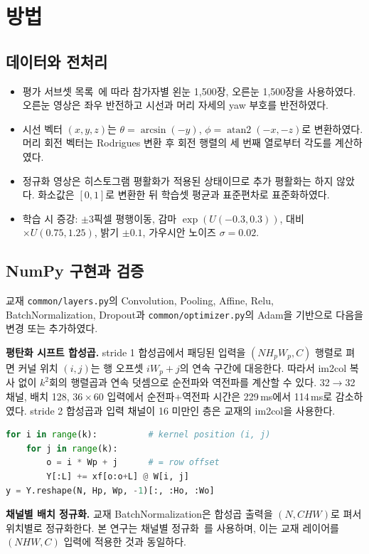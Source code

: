 \documentclass[10pt,twocolumn,a4paper]{article}
\begin{document}
\section{방법}
\subsection{데이터와 전처리}
\begin{itemize}
\item 평가 서브셋 목록~\cite{zhang2015}에 따라 참가자별 왼눈 1,500장, 오른눈 1,500장을 사용하였다. 오른눈 영상은 좌우 반전하고 시선과 머리 자세의 yaw 부호를 반전하였다.
\item 시선 벡터 $(x,y,z)$는 $\theta=\arcsin(-y)$, $\phi=\operatorname{atan2}(-x,-z)$로 변환하였다. 머리 회전 벡터는 Rodrigues 변환 후 회전 행렬의 세 번째 열로부터 각도를 계산하였다.
\item 정규화 영상은 히스토그램 평활화가 적용된 상태이므로 추가 평활화는 하지 않았다. 화소값은 $[0,1]$로 변환한 뒤 학습셋 평균과 표준편차로 표준화하였다.
\item 학습 시 증강: $\pm3$픽셀 평행이동, 감마 $\exp(U(-0.3,0.3))$, 대비 $\times U(0.75,1.25)$, 밝기 $\pm0.1$, 가우시안 노이즈 $\sigma=0.02$.
\end{itemize}

\subsection{NumPy 구현과 검증}
교재 \texttt{common/layers.py}의 Convolution, Pooling, Affine, Relu, BatchNormalization, Dropout과 \texttt{common/optimizer.py}의 Adam을 기반으로 다음을 변경 또는 추가하였다.

\textbf{평탄화 시프트 합성곱.} stride 1 합성곱에서 패딩된 입력을 $(N H_p W_p, C)$ 행렬로 펴면 커널 위치 $(i,j)$는 행 오프셋 $iW_p+j$의 연속 구간에 대응한다. 따라서 im2col 복사 없이 $k^2$회의 행렬곱과 연속 덧셈으로 순전파와 역전파를 계산할 수 있다. 32$\to$32 채널, 배치 128, $36\times60$ 입력에서 순전파+역전파 시간은 229\,ms에서 114\,ms로 감소하였다. stride 2 합성곱과 입력 채널이 16 미만인 층은 교재의 im2col을 사용한다.
\begin{lstlisting}[language=Python]
for i in range(k):          # kernel position (i, j)
    for j in range(k):
        o = i * Wp + j      # = row offset
        Y[:L] += xf[o:o+L] @ W[i, j]
y = Y.reshape(N, Hp, Wp, -1)[:, :Ho, :Wo]
\end{lstlisting}

\textbf{채널별 배치 정규화.} 교재 BatchNormalization은 합성곱 출력을 $(N, CHW)$로 펴서 위치별로 정규화한다. 본 연구는 채널별 정규화~\cite{bn}를 사용하며, 이는 교재 레이어를 $(NHW, C)$ 입력에 적용한 것과 동일하다.
\end{document}
